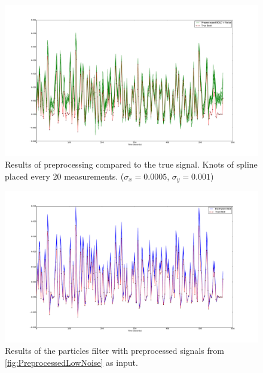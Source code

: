 \begin{figure}
\centering
\includegraphics[clip=true,trim=6cm 2cm 5cm 3.5cm,width=15cm]{images/preprocessed_lownoise}
\caption[Preprocessed Signal with Low Noise/Drift]
{Results of preprocessing compared to the true signal. 
 Knots of spline placed every 20 measurements.
 ($\sigma_x = 0.0005$, $\sigma_y = 0.001$)}
\label{fig:PreprocessedLowNoise}
\end{figure}

\begin{figure}
\centering
\includegraphics[clip=true,trim=6cm 2cm 5cm 3.5cm,width=15cm]{images/comparison_lownoise}
\caption[Results with Low Noise/Drift]
{Results of the particles filter with preprocessed signals from \autoref{fig:PreprocessedLowNoise}
as input.}
\label{fig:FitComparisonLowNoise}
\end{figure}

